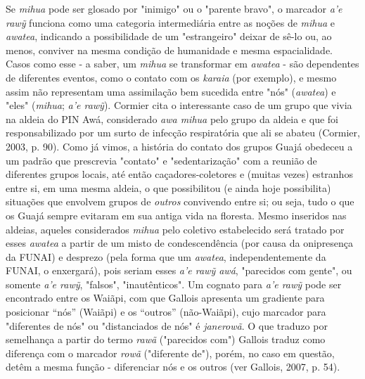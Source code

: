 Se \emph{mihua} pode ser glosado por "inimigo" ou o "parente bravo", o
marcador \emph{a'e rawỹ} funciona como uma categoria intermediária entre
as noções de \emph{mihua} e \emph{awatea}, indicando a possibilidade de
um "estrangeiro" deixar de sê-lo ou, ao menos, conviver na mesma
condição de humanidade e mesma espacialidade. Casos como esse - a saber,
um \emph{mihua} se transformar em \emph{awatea} - são dependentes de
diferentes eventos, como o contato com os \emph{karaia} (por exemplo), e
mesmo assim não representam uma assimilação bem sucedida entre "nós"
(\emph{awatea}) e "eles" (\emph{mihua}; \emph{a'e rawỹ}). Cormier cita o
interessante caso de um grupo que vivia na aldeia do PIN Awá,
considerado \emph{awa mihua} pelo grupo da aldeia e que foi
responsabilizado por um surto de infecção respiratória que ali se abateu
(Cormier, 2003, p. 90). Como já vimos, a história do contato dos grupos
Guajá obedeceu a um padrão que prescrevia "contato" e "sedentarização"
com a reunião de diferentes grupos locais, até então caçadores-coletores
e (muitas vezes) estranhos entre si, em uma mesma aldeia, o que
possibilitou (e ainda hoje possibilita) situações que envolvem grupos de
\emph{outros} convivendo entre si; ou seja, tudo o que os Guajá sempre
evitaram em sua antiga vida na floresta. Mesmo inseridos nas aldeias,
aqueles considerados \emph{mihua} pelo coletivo estabelecido será
tratado por esses \emph{awatea} a partir de um misto de condescendência
(por causa da onipresença da FUNAI) e desprezo (pela forma que um
\emph{awatea}, independentemente da FUNAI, o enxergará), pois seriam
esses \emph{a'e rawỹ awá}, "parecidos com gente", ou somente \emph{a'e
rawỹ}, "falsos", "inautênticos". Um cognato para \emph{a'e rawỹ} pode
ser encontrado entre os Waiãpi, com que Gallois apresenta um gradiente
para posicionar ``nós'' (Waiãpi) e os ``outros'' (não-Waiãpi), cujo
marcador para "diferentes de nós" ou "distanciados de nós" é
\emph{janerowã}. O que traduzo por semelhança a partir do termo
\emph{rawã} ("parecidos com") Gallois traduz como diferença com o
marcador \emph{rowã} ("diferente de"), porém, no caso em questão, detêm
a mesma função - diferenciar nós e os outros (ver Gallois, 2007, p. 54).

